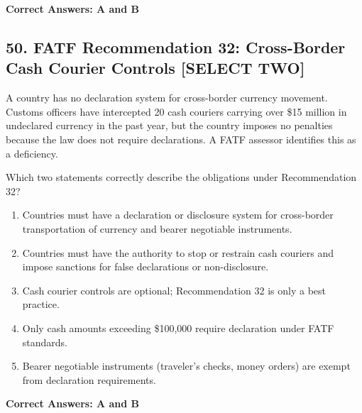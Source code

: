 \documentclass[11pt,a4paper]{article}
\begin{document}
	\textbf{Correct Answers: A and B}
	
	\subsection{50. FATF Recommendation 32: Cross-Border Cash Courier Controls \textnormal{[SELECT TWO]}}
	
	A country has no declaration system for cross-border currency movement. Customs officers have intercepted 20 cash couriers carrying over \$15 million in undeclared currency in the past year, but the country imposes no penalties because the law does not require declarations. A FATF assessor identifies this as a deficiency.
	
	Which two statements correctly describe the obligations under Recommendation 32?
	
	\begin{enumerate}[label=\Alph*.]
		\item Countries must have a declaration or disclosure system for cross-border transportation of currency and bearer negotiable instruments.
		\item Countries must have the authority to stop or restrain cash couriers and impose sanctions for false declarations or non-disclosure.
		\item Cash courier controls are optional; Recommendation 32 is only a best practice.
		\item Only cash amounts exceeding \$100,000 require declaration under FATF standards.
		\item Bearer negotiable instruments (traveler's checks, money orders) are exempt from declaration requirements.
	\end{enumerate}
	
	\textbf{Correct Answers: A and B}
	
\end{document}
